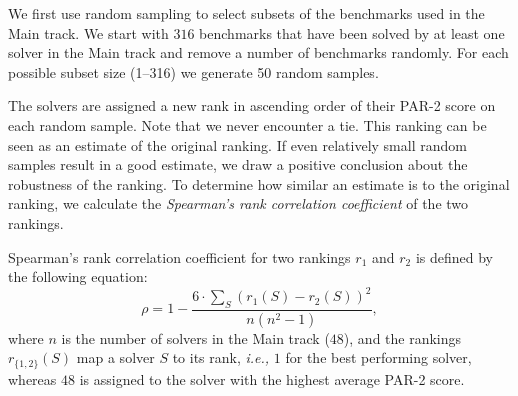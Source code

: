 \documentclass{elsarticle}
\begin{document}
We first use random sampling to select subsets of the benchmarks used in the Main track.
We start with $316$ benchmarks that have been solved by at least one solver in
the Main track and remove a number of benchmarks randomly. For each
possible subset size (1--316) we generate 50 random samples.

The solvers are assigned a new rank in ascending order of their PAR-2 score on
each random sample. Note that we never encounter a tie. This ranking can be
seen as an estimate of the original ranking.
If even relatively small random samples result in a good estimate, we draw a
positive conclusion about the robustness of the ranking.
To determine how similar an estimate is to the original ranking, we calculate
the \emph{Spearman's rank correlation coefficient} of the two rankings.

Spearman's rank correlation coefficient
for two rankings $r_{1}$ and $r_{2}$
is defined by the following equation:
\[
    \rho = 1 - \frac{6\cdot\sum_{S}{(r_{1}(S) - r_{2}(S))^2}}{n(n^2-1)},
\]
where $n$ is the number of solvers in the Main track ($48$), and the rankings
$r_{\{1,2\}}(S)$ map a solver $S$ to its rank, \emph{i.e.,} $1$ for the best
performing solver, whereas $48$ is assigned to the solver
with the highest average PAR-2 score.
\end{document}
